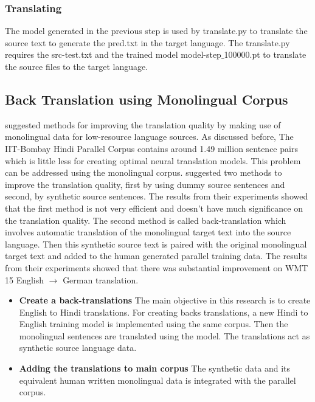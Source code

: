 \subsubsection{Translating}
The model generated in the previous step is used by translate.py to translate the source text to generate the pred.txt in the target language. The translate.py requires the src-test.txt and the trained model model-step$\_$100000.pt to  translate the source files to the target language. 

\subsection{Back Translation using Monolingual Corpus}
\label{backtrans}
\cite{DBLP:journals/corr/SennrichHB15a} suggested methods for improving the translation quality by making use of monolingual data for low-resource language sources. As discussed before, The IIT-Bombay Hindi Parallel Corpus contains around 1.49 million sentence pairs which is little less for creating optimal neural translation models. This problem can be addressed using the monolingual corpus.\cite{DBLP:journals/corr/SennrichHB15a} suggested two methods to improve the translation quality, first by using dummy source sentences and second, by synthetic source sentences. The results from their experiments showed that the first method is not very efficient and doesn't have much significance on the translation quality. The second method is called back-translation which involves automatic translation of
the monolingual target text into the source language. Then this synthetic source text is paired with the original monolingual target text and added to the human generated parallel training data. The results from their experiments showed that there was substantial improvement on WMT 15 English $\rightarrow$ German translation. 

\begin{itemize}
    \item \textbf{Create a back-translations} The main objective in this research is to create English to Hindi translations. For creating backs translations, a new Hindi to English training model is implemented using the same corpus. Then the monolingual sentences are translated using the model. The translations act as synthetic source language data.
    \item \textbf{Adding the translations to main corpus} The synthetic data and its equivalent human written monolingual data is integrated with the parallel corpus.
\end{itemize}

